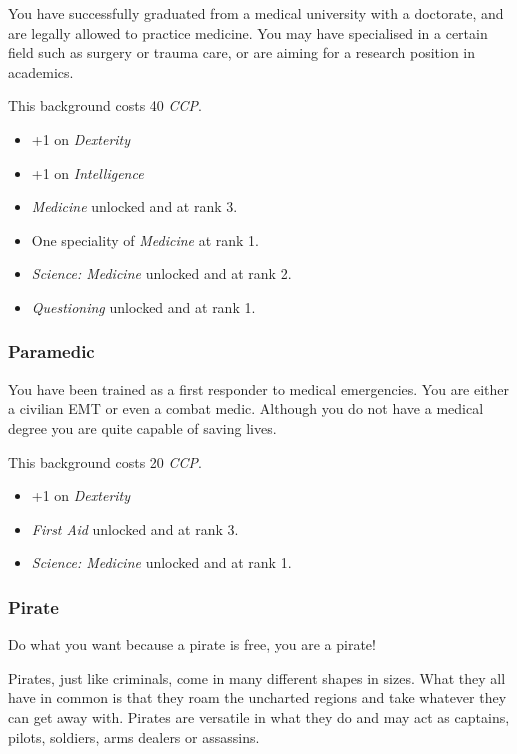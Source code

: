 You have successfully graduated from a medical university with a doctorate,
and are legally allowed to practice medicine. You may have specialised in
a certain field such as surgery or trauma care, or are aiming for a research
position in academics.

This background costs 40 \emph{CCP}.

\begin{itemize}
\item +1 on \emph{Dexterity}
\item +1 on \emph{Intelligence}
\item \emph{Medicine} unlocked and at rank 3.
\item One speciality of \emph{Medicine} at rank 1.
\item \emph{Science: Medicine} unlocked and at rank 2.
\item \emph{Questioning} unlocked and at rank 1.
\end{itemize}

\subsubsection{Paramedic}

You have been trained as a first responder to medical emergencies. You are
either a civilian EMT or even a combat medic. Although you do not have a medical
degree you are quite capable of saving lives.

This background costs 20 \emph{CCP}.

\begin{itemize}
\item +1 on \emph{Dexterity}
\item \emph{First Aid} unlocked and at rank 3.
\item \emph{Science: Medicine} unlocked and at rank 1.
\end{itemize}

\subsubsection{Pirate}

Do what you want because a pirate is free, you are a pirate!

Pirates, just like criminals, come in many different shapes in sizes. What they
all have in common is that they roam the uncharted regions and take whatever
they can get away with. Pirates are versatile in what they do and may act as
captains, pilots, soldiers, arms dealers or assassins.

